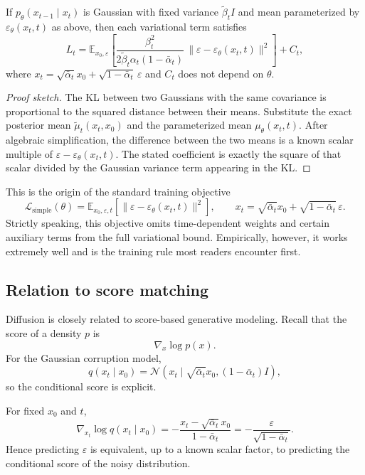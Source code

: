 \begin{proposition}
If $p_\theta(x_{t-1}\mid x_t)$ is Gaussian with fixed variance $\tilde\beta_t I$ and mean parameterized by $\varepsilon_\theta(x_t,t)$ as above, then each variational term satisfies
\[
L_t
=
\mathbb{E}_{x_0,\varepsilon}
\left[
\frac{\beta_t^2}{2\tilde\beta_t\alpha_t(1-\bar\alpha_t)}
\,\|\varepsilon-\varepsilon_\theta(x_t,t)\|^2
\right] + C_t,
\]
where $x_t=\sqrt{\bar\alpha_t}x_0+\sqrt{1-\bar\alpha_t}\,\varepsilon$ and $C_t$ does not depend on $\theta$.
\end{proposition}

\begin{proof}[Proof sketch]
The KL between two Gaussians with the same covariance is proportional to the squared distance between their means.
Substitute the exact posterior mean $\tilde\mu_t(x_t,x_0)$ and the parameterized mean $\mu_\theta(x_t,t)$.
After algebraic simplification, the difference between the two means is a known scalar multiple of $\varepsilon-\varepsilon_\theta(x_t,t)$.
The stated coefficient is exactly the square of that scalar divided by the Gaussian variance term appearing in the KL.
\end{proof}

This is the origin of the standard training objective
\[
\mathcal{L}_{\mathrm{simple}}(\theta)
=
\mathbb{E}_{x_0,\varepsilon,t}
\left[
\|\varepsilon-\varepsilon_\theta(x_t,t)\|^2
\right],
\qquad
x_t=\sqrt{\bar\alpha_t}x_0+\sqrt{1-\bar\alpha_t}\,\varepsilon.
\]
Strictly speaking, this objective omits time-dependent weights and certain auxiliary terms from the full variational bound.
Empirically, however, it works extremely well and is the training rule most readers encounter first.

\subsection*{Relation to score matching}

Diffusion is closely related to score-based generative modeling.
Recall that the score of a density $p$ is
\[
\nabla_x \log p(x).
\]
For the Gaussian corruption model,
\[
q(x_t\mid x_0)=\mathcal{N}\!\left(x_t\mid \sqrt{\bar\alpha_t}x_0,(1-\bar\alpha_t)I\right),
\]
so the conditional score is explicit.

\begin{proposition}
For fixed $x_0$ and $t$,
\[
\nabla_{x_t}\log q(x_t\mid x_0)
=
-\frac{x_t-\sqrt{\bar\alpha_t}x_0}{1-\bar\alpha_t}
=
-\frac{\varepsilon}{\sqrt{1-\bar\alpha_t}}.
\]
Hence predicting $\varepsilon$ is equivalent, up to a known scalar factor, to predicting the conditional score of the noisy distribution.
\end{proposition}

